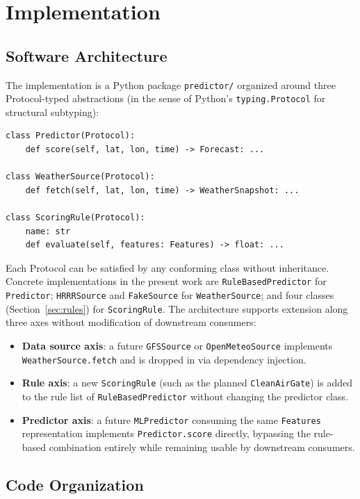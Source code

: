 \documentclass[11pt,a4paper]{article}
\begin{document}
\section{Implementation}
\label{sec:implementation}

\subsection{Software Architecture}
\label{sec:architecture}

The implementation is a Python package \texttt{predictor/} organized around three Protocol-typed abstractions (in the sense of Python's \texttt{typing.Protocol} for structural subtyping):

\begin{verbatim}
class Predictor(Protocol):
    def score(self, lat, lon, time) -> Forecast: ...

class WeatherSource(Protocol):
    def fetch(self, lat, lon, time) -> WeatherSnapshot: ...

class ScoringRule(Protocol):
    name: str
    def evaluate(self, features: Features) -> float: ...
\end{verbatim}

Each Protocol can be satisfied by any conforming class without inheritance. Concrete implementations in the present work are \texttt{RuleBasedPredictor} for \texttt{Predictor}; \texttt{HRRRSource} and \texttt{FakeSource} for \texttt{WeatherSource}; and four classes (Section~\ref{sec:rules}) for \texttt{ScoringRule}. The architecture supports extension along three axes without modification of downstream consumers:
\begin{itemize}
\item \textbf{Data source axis}: a future \texttt{GFSSource} or \texttt{OpenMeteoSource} implements \texttt{WeatherSource.fetch} and is dropped in via dependency injection.
\item \textbf{Rule axis}: a new \texttt{ScoringRule} (such as the planned \texttt{CleanAirGate}) is added to the rule list of \texttt{RuleBasedPredictor} without changing the predictor class.
\item \textbf{Predictor axis}: a future \texttt{MLPredictor} consuming the same \texttt{Features} representation implements \texttt{Predictor.score} directly, bypassing the rule-based combination entirely while remaining usable by downstream consumers.
\end{itemize}

\subsection{Code Organization}
\label{sec:code}
\end{document}
